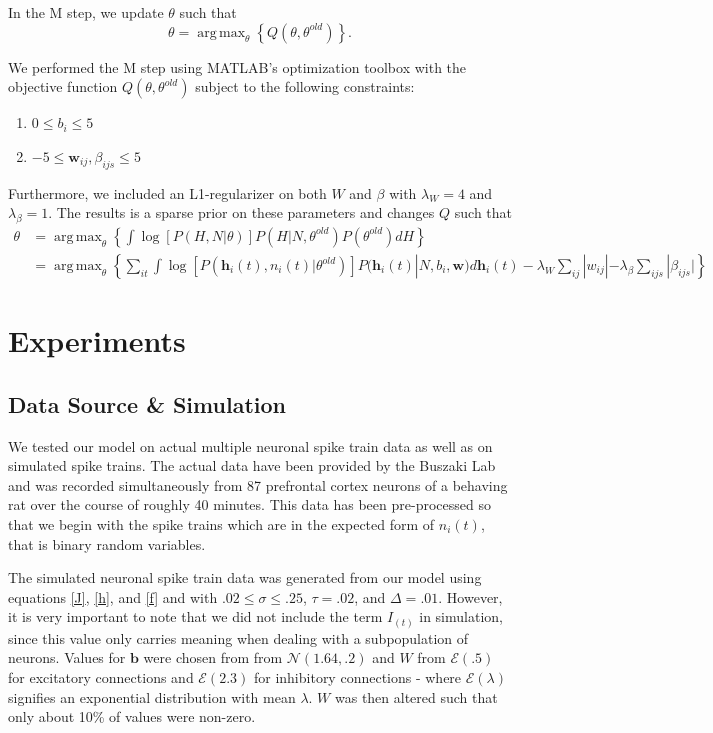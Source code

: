 \documentclass{article}
\DeclareMathOperator*{\argmax}{arg\,max}
\begin{document}
In the M step, we update $\theta$ such that 
\begin{equation}
\label{M} \theta = \argmax_{\theta} \left\{ Q(\theta,\theta^{old}) \right\}.
\end{equation}

We performed the M step using MATLAB's optimization toolbox with the
objective function $Q(\theta,\theta^{old})$ subject to the following constraints:
\begin{enumerate}
\item $0 \leq b_{i} \leq 5$
\item $-5 \leq \mathbf{w}_{ij}, \beta_{ijs} \leq 5$
\end{enumerate}

Furthermore, we included an L1-regularizer on both $W$ and $\beta$ with $\lambda_{W} = 4$ and $\lambda_{\beta} = 1$. The results is a sparse prior on these parameters and changes $Q$ such that
\begin{align*} 
 \label{Q}  
\theta &= \argmax_{\theta} \left\{ \int{ \log\left[P(H,N|\theta)\right] P(H|N,\theta^{old})P(\theta^{old}) dH }\right\}
\\                     &= \argmax_{\theta} \left\{\sum_{it} \int \log\left[P(\mathbf{h}_i(t),n_i(t)|\theta^{old})\right] P(\mathbf{h}_i(t)|N,b_i,\mathbf{w}) d\mathbf{h}_i(t) - \lambda_{W}\sum_{ij}|w_{ij}| - \lambda_{\beta}\sum_{ijs}|\beta_{ijs}|\right\}
\end{align*} 
\section{Experiments}

\subsection{Data Source \& Simulation}

We tested our model on actual multiple neuronal spike train data as well as on simulated spike trains. The actual data have been provided by the Buszaki Lab and was recorded simultaneously from 87 prefrontal cortex neurons of a behaving rat over the course of roughly 40 minutes. This data has been pre-processed so that we begin with the spike trains which are in the expected form of $n_i(t)$, that is binary random variables. 

The simulated neuronal spike train data was generated from our model using equations \eqref{J}, \eqref{h}, and \eqref{f} and with $.02 \leq \sigma \leq .25$, $\tau = .02$, and $\Delta = .01$. However, it is very important to note that we did not include the term $I_(t)$ in simulation, since this value only carries meaning when dealing with a subpopulation of neurons. Values for $\mathbf{b}$ were chosen from from $\mathcal{N}(1.64,.2)$ and $W$ from $\mathcal{E}(.5)$ for excitatory connections and $\mathcal{E}(2.3)$ for inhibitory connections - where $\mathcal{E}(\lambda)$ signifies an exponential distribution with mean $\lambda$. $W$ was then altered such that only about 10\% of values were non-zero.
\end{document}

